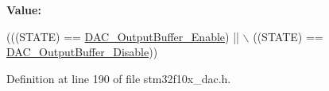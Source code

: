 {\bfseries Value\+:}
\begin{DoxyCode}
(((STATE) == \hyperlink{group___d_a_c__output__buffer_gab3f92803a8b6bc5fb3e4859908b5161f}{DAC\_OutputBuffer\_Enable}) || \(\backslash\)
                                           ((STATE) == \hyperlink{group___d_a_c__output__buffer_gad41f919d7141398cfdedf8218ce64450}{DAC\_OutputBuffer\_Disable}))
\end{DoxyCode}


Definition at line 190 of file stm32f10x\+\_\+dac.\+h.

